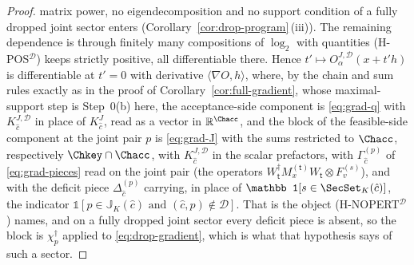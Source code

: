 \begin{proof}
matrix power, no eigendecomposition and no support condition of a fully dropped
joint sector enters
(Corollary~\ref{cor:drop-program}\,(iii)). The remaining
dependence is through finitely many compositions of $\log_2$ with quantities
(H-POS$^{\mathcal{D}}$) keeps strictly positive, all differentiable there.
Hence $t'\mapsto O^{J,\mathcal{D}}_{\alpha}(x+t'h)$ is differentiable at
$t'=0$ with derivative $\langle\nabla O,h\rangle$, where, by the chain and sum
rules exactly as in the proof of
Corollary~\ref{cor:full-gradient}, whose maximal-support step is
Step~0(b) here, the acceptance-side component is \eqref{eq:grad-q} with
$K^{J,\mathcal{D}}_{\hat c}$ in place of $K^{J}_{\hat c}$, read as a vector in
$\mathbb{R}^{\Chacc}$, and the block of the feasible-side component at the
joint pair $p$ is \eqref{eq:grad-J} with the sums restricted to $\Chacc$,
respectively $\Chkey\cap\Chacc$, with $K^{J,\mathcal{D}}_{\hat c}$ in the
scalar prefactors, with $\Gamma^{(p)}_{\hat c}$ of
\eqref{eq:grad-pieces} read on the joint pair (the operators
$W_{\mathsf t}^{\dagger}M^{(\mathsf t)}_xW_{\mathsf t}\otimes F^{(s)}_v$), and
with the deficit piece $\Delta^{(p)}_{\hat c}$ carrying, in place of
$\mathbb 1[s\in\SecSet_K(\hat c)]$, the indicator
$\mathbb 1[p\in\mathbb{J}_K(\hat c)\text{ and }(\hat c,p)\notin\mathcal{D}]$.
That is the object (H-NOPERT$^{\mathcal{D}}$) names, and on a fully
dropped joint sector every deficit piece is absent, so the block is
$\chi_p^{\dagger}$ applied to \eqref{eq:drop-gradient}, which is what that
hypothesis says of such a sector.


\end{proof}
